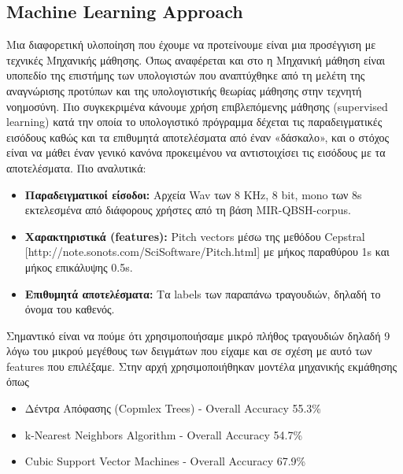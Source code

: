 \subsection{Machine Learning Approach}
Μια διαφορετική υλοποίηση που έχουμε να προτείνουμε είναι μια προσέγγιση με τεχνικές Μηχανικής μάθησης. Όπως αναφέρεται και στο %
 η Μηχανική μάθηση είναι υποπεδίο της επιστήμης των υπολογιστών που αναπτύχθηκε από τη μελέτη της αναγνώρισης προτύπων και της  υπολογιστικής θεωρίας μάθησης στην τεχνητή νοημοσύνη. Πιο συγκεκριμένα κάνουμε χρήση επιβλεπόμενης μάθησης (supervised learning) κατά την οποία το υπολογιστικό πρόγραμμα δέχεται τις παραδειγματικές εισόδους καθώς και τα επιθυμητά αποτελέσματα από έναν «δάσκαλο», και ο στόχος είναι να μάθει έναν γενικό κανόνα προκειμένου να αντιστοιχίσει τις εισόδους με τα αποτελέσματα.
Πιο αναλυτικά:
\begin{itemize}
  \item \textbf{Παραδειγματικοί είσοδοι:} Αρχεία Wav των 8 KHz, 8 bit, mono των 8s εκτελεσμένα από διάφορους χρήστες από τη βάση MIR-QBSH-corpus. %
  \item \textbf{Χαρακτηριστικά (features):} Pitch vectors μέσω της μεθόδου Cepstral [http://note.sonots.com/SciSoftware/Pitch.html] με μήκος παραθύρου 1s και μήκος επικάλυψης 0.5s.
  \item \textbf{Επιθυμητά αποτελέσματα:} Τα labels των παραπάνω τραγουδιών, δηλαδή το όνομα του καθενός.
\end{itemize}

Σημαντικό είναι να πούμε ότι χρησιμοποιήσαμε μικρό πλήθος τραγουδιών δηλαδή 9 λόγω του μικρού μεγέθους των δειγμάτων που είχαμε και σε σχέση με αυτό των features που επιλέξαμε.
Στην αρχή χρησιμοποιήθηκαν μοντέλα μηχανικής εκμάθησης όπως 
\begin{itemize}
  \item Δέντρα Απόφασης (Copmlex Trees) - Overall Accuracy 55.3\%  
  \item k-Nearest Neighbors Algorithm 	- Overall Accuracy 54.7\%
  \item Cubic Support Vector Machines	- Overall Accuracy 67.9\%
\end{itemize}
